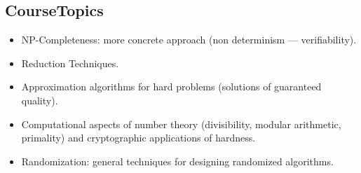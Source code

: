 \subsection{CourseTopics}
\begin{itemize}
\item NP-Completeness: more concrete approach (non determinism --- verifiability).
\item Reduction Techniques.
\item Approximation algorithms for hard problems (solutions of guaranteed quality).
\item Computational aspects of number theory (divisibility, modular arithmetic, primality) and cryptographic applications of hardness.
\item Randomization: general techniques for designing randomized algorithms.
\end{itemize}
